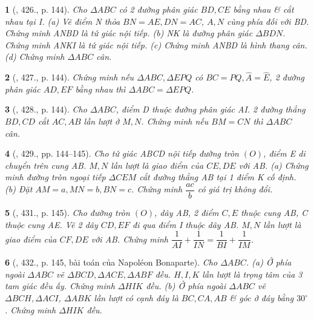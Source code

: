 \documentclass{article}
\newtheorem{baitoan}{}
\begin{document}
\begin{baitoan}[\cite{Binh_Toan_9_tap_2}, 426., p. 144]
	Cho $\Delta ABC$ có 2 đường phân giác $BD,CE$ bằng nhau \& cắt nhau tại I. (a) Vẽ điểm N thỏa $BN = AE,DN = AC$, $A,N$ cùng phía đối với BD. Chứng minh ANBD là tứ giác nội tiếp. (b) NK là đường phân giác $\Delta BDN$. Chứng minh ANKI là tứ giác nội tiếp. (c) Chứng minh ANBD là hình thang cân. (d) Chứng minh $\Delta ABC$ cân.
\end{baitoan}

\begin{baitoan}[\cite{Binh_Toan_9_tap_2}, 427., p. 144]
	Chứng minh nếu $\Delta ABC,\Delta EPQ$ có $BC = PQ,\widehat{A} = \widehat{E}$, 2 đường phân giác $AD,EF$ bằng nhau thì $\Delta ABC = \Delta EPQ$.
\end{baitoan}

\begin{baitoan}[\cite{Binh_Toan_9_tap_2}, 428., p. 144]
	Cho $\Delta ABC$, điểm D thuộc đường phân giác AI. 2 đường thẳng $BD,CD$ cắt $AC,AB$ lần lượt ở $M,N$. Chứng minh nếu $BM = CN$ thì $\Delta ABC$ cân.
\end{baitoan}

\begin{baitoan}[\cite{Binh_Toan_9_tap_2}, 429., pp. 144--145]
	Cho tứ giác ABCD nội tiếp đường tròn $(O)$, điểm E di chuyển trên cung AB. $M,N$ lần lượt là giao điểm của $CE,DE$ với AB. (a) Chứng minh đường tròn ngoại tiếp $\Delta CEM$ cắt đường thẳng AB tại 1 điểm K cố định. (b) Đặt $AM = a,MN = b,BN = c$. Chứng minh $\dfrac{ac}{b}$ có giá trị không đổi.
\end{baitoan}

\begin{baitoan}[\cite{Binh_Toan_9_tap_2}, 431., p. 145]
	Cho đường tròn $(O)$, dây AB, 2 điểm $C,E$ thuộc cung AB, C thuộc cung AE. Vẽ 2 dây $CD,EF$ đi qua điểm I thuộc dây AB. $M,N$ lần lượt là giao điểm của $CF,DE$ với AB. Chứng minh $\dfrac{1}{AI} + \dfrac{1}{IN} = \dfrac{1}{BI} + \dfrac{1}{IM}$.
\end{baitoan}

\begin{baitoan}[\cite{Binh_Toan_9_tap_2}, 432., p. 145, bài toán của Napol\'eon Bonaparte]
	Cho $\Delta ABC$. (a) Ở phía ngoài $\Delta ABC$ vẽ $\Delta BCD,\Delta ACE,\Delta ABF$ đều. $H,I,K$ lần lượt là trọng tâm của 3 tam giác đều ấy. Chứng minh $\Delta HIK$ đều. (b) Ở phía ngoài $\Delta ABC$ vẽ $\Delta BCH,\Delta ACI$, $\Delta ABK$ lần lượt có cạnh đáy là $BC,CA,AB$ \& góc ở đáy bằng $30^\circ$. Chứng minh $\Delta HIK$ đều.
\end{baitoan}
\end{document}
